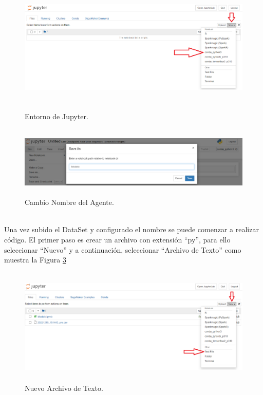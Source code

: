 \documentclass[a4paper,10pt, oneside, titlepage]{article}
\begin{document}
	\begin{figure}[!h]
		\centering
		\includegraphics[width = 1\linewidth, height = 6.4cm]{Jupyter_Python.png}
		\caption{Entorno de Jupyter.}
		\label{Jupyter_Python}
	\end{figure}
	\begin{figure}[!h]
		\centering
		\includegraphics[width = 1\linewidth, height = 3.4cm]{Jupyter_Nombre.png}
		\caption{Cambio Nombre del Agente.}
		\label{Jupyter_Nombre}
	\end{figure} \\
	\indent Una vez subido el DataSet y configurado el nombre se puede comenzar a realizar código. El primer paso es crear un archivo con extensión ``py'', para ello seleccionar ``Nuevo'' y a continuación, seleccionar ``Archivo de Texto'' como muestra la Figura \ref{Jupyter_Nuevo_Py}
	\begin{figure}[!h]
		\centering
		\includegraphics[width = 1\linewidth, height = 5.6cm]{Jupyter_Nuevo_Py.png}
		\caption{Nuevo Archivo de Texto.}
		\label{Jupyter_Nuevo_Py}
	\end{figure} \\
\end{document}
